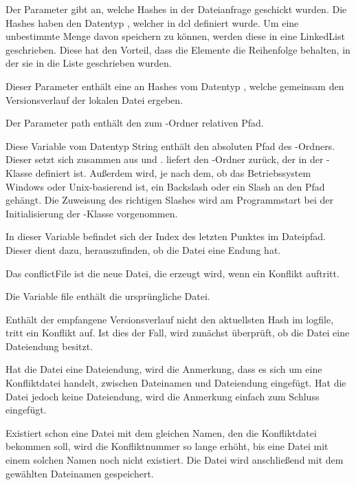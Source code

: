 \begin{description}
	 Der Parameter gibt an, welche Hashes in der Dateianfrage geschickt wurden. Die Hashes haben den Datentyp , welcher in \gls{dcl} definiert wurde. Um eine unbestimmte Menge davon speichern zu können, werden diese in eine LinkedList geschrieben. Diese hat den Vorteil, dass die Elemente die Reihenfolge behalten, in der sie in die Liste geschrieben wurden.
	
	 Dieser Parameter enthält eine  an Hashes vom Datentyp , welche gemeinsam den Versionsverlauf der lokalen Datei ergeben. 
	
	 Der Parameter path enthält den zum \sblit-Ordner relativen Pfad.
	
	 Diese Variable vom Datentyp String enthält den absoluten Pfad des \sblit-Ordners. Dieser setzt sich zusammen aus  und .  liefert den \sblit-Ordner zurück, der in der -Klasse definiert ist. Außerdem wird, je nach dem, ob das Betriebssystem Windows oder Unix-basierend ist, ein Backslash oder ein Slash an den Pfad gehängt. Die Zuweisung des richtigen Slashes wird am Programmstart bei der Initialisierung der -Klasse vorgenommen.

	 In dieser Variable befindet sich der Index des letzten Punktes im Dateipfad. Dieser dient dazu, herauszufinden, ob die Datei eine Endung hat.
	
	 Das conflictFile ist die neue Datei, die erzeugt wird, wenn ein Konflikt auftritt.
	
	 Die Variable file enthält die ursprüngliche Datei.
\end{description}
Enthält der empfangene Versionsverlauf nicht den aktuellsten Hash im \gls{logfile}, tritt ein Konflikt auf. Ist dies der Fall, wird zunächst überprüft, ob die Datei eine Dateiendung besitzt.

Hat die Datei eine Dateiendung, wird die Anmerkung, dass es sich um eine Konfliktdatei handelt, zwischen Dateinamen und Dateiendung eingefügt. Hat die Datei jedoch keine Dateiendung, wird die Anmerkung einfach zum Schluss eingefügt.

Existiert schon eine Datei mit dem gleichen Namen, den die Konfliktdatei bekommen soll, wird die Konfliktnummer so lange erhöht, bis eine Datei mit einem solchen Namen noch nicht existiert. Die Datei wird anschließend mit dem gewählten Dateinamen gespeichert.